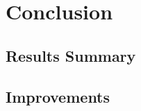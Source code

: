 \documentclass{article}
\begin{document}
\section{Conclusion}

\subsection{Results Summary}


\subsection{Improvements}
\subsection{}
\subsection{}
\end{document}
